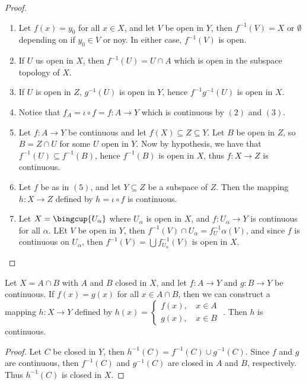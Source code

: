 \begin{proof}
    \begin{enumerate}[label=(\arabic*)]
        \item Let $f (x)=y_0$ for all $x \in X$, and let  $V$ be open in  $Y$, then  $f^{-1}(V)=X$
            or $\emptyset$ depending on if $ y_0 \in V$ or noy. In either case, $f^{-1}(V)$ is open.

        \item If $U$ us open in  $X$, then  $f^{-1}(U)=U \cap A$ which is open in the subspace
            topology of $X$.

        \item If $U$ is open in  $Z$,  $g^{-1}(U)$ is open in $Y$, hence  $f^{-1}g^{-1}(U)$ is
            open in $X$.

        \item Notice that  $f_A=\iota \circ f=f:A \rightarrow Y$ which is continuous by $(2)$
            and $(3)$.

        \item Let $f:A \rightarrow Y$ be continuous and let  $f(X) \subseteq Z \subseteq Y$. Let $B$
            be open in  $Z$, so  $B=Z \cap U$ for some  $U$ open in  $Y$. Now by hypothesis, we have
            that $f^{-1}(U) \subseteq f^{-1}(B)$, hence $f^{-1}(B)$ is open in $X$, thus  $f:X
            \rightarrow Z$ is continuous.

        \item Let  $f$ be as in  $(5)$, and let $Y \subseteq Z$ be a subspace of  $Z$. Then the
            mapping  $h:X \rightarrow Z$ defined by $h=\iota \circ f$ is continuous.

        \item Let  $X=\bingcup{U_{\alpha}}$ where $U_{\alpha}$ is open in $X$, and $f:U_{\alpha}
            \rightarrow Y$ is continuous for all  $\alpha$. LEt $V$ be open in  $Y$, then
            $f^{-1}(V) \cap U_{\alpha}=f^{-1}_U{\alpha}(V)$, and since $f$ is continuous on
            $U_{\alpha}$, then $f^{-1}(V)=\bigcup{f^{-1}_{U_{\alpha}}(V)}$ is open in $X$.
    \end{enumerate}
\end{proof}

\begin{theorem}\label{1.7.4}
    Let $X=A \cap B$ with  $A$ and  $B$ closed in  $X$, and let  $f:A \rightarrow Y$ and  $g:B
    \rightarrow Y$ be continuous. If  $f(x)=g(x)$ for all $x \in A \cap B$, then we can
    construct a mapping  $h:X \rightarrow Y$ defined by  $h(x)=
        \begin{cases}
            f(x) \text{, } & x \in A \\
            g(x) \text{, } & x \in B
        \end{cases}$
    . Then $h$ is continuous.
\end{theorem}
\begin{proof} 
    Let $C$ be closed in  $Y$, then  $h^{-1}(C)=f^{-1}(C) \cup g^{-1}(C)$. Since $f$ and  $g$ are
    continuous, then  $f^{-1}(C)$ and $g^{-1}(C)$ are closed in $A$ and  $B$, respectively. Thus
    $h^{-1}(C)$ is closed in $X$.
\end{proof}

